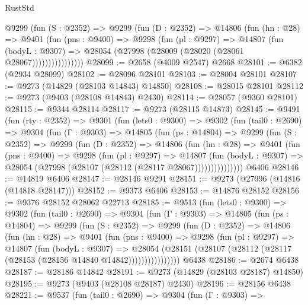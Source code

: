\begin{lexlean}{RustStd}
\begin{coremodule}
              @9299
                (fun (S : @2352) =>
                @9299
                  (fun (D : @2352) =>
                  @14806
                    (fun (hn : @28) =>
                    @9401
                      (fun (pns : @9400) =>
                      @9298
                        (fun (pl : @9297) =>
                        @14807
                          (fun (bodyL : @9307) =>
                          @28054 (@27998 (@28009 (@28020 (@28061 @28067))))))))))))))))
@28099 := @2658 (@4009 @2547) @2668
@28101 := @6382 (@2934 @28099)
@28102 := @28096 @28101
@28103 := @28004 @28101
@28107 := @9273 (@14829 (@28103 @14843) @14850)
@28108 := @28015 @28101
@28112 := @9273 (@9403 (@28108 @14843) @2430)
@28114 := @28057 (@9360 @28101)
@28115 := @9344 @28114
@28117 := @9273 (@28115 @14873)
@28145 := @9491
    (fun (rty : @2352) =>
    @9301
      (fun (lets0 : @9300) =>
      @9302
        (fun (tail0 : @2690) =>
        @9304
          (fun (Γ : @9303) =>
          @14805
            (fun (ps : @14804) =>
            @9299
              (fun (S : @2352) =>
              @9299
                (fun (D : @2352) =>
                @14806
                  (fun (hn : @28) =>
                  @9401
                    (fun (pns : @9400) =>
                    @9298
                      (fun (pl : @9297) =>
                      @14807
                        (fun (bodyL : @9307) =>
                        @28054 (@27998 (@28107 (@28112 (@28117 @28067)))))))))))))))
    @6406
@28146 := @14819 @6406
@28147 := @28146 @9291
@28151 := @9273 (@27996 (@14816 (@14818 @28147)))
@28152 := @9373 @6406
@28153 := @14876 @28152
@28156 := @9376 @28152 @28062 @22713
@28185 := @9513
    (fun (lets0 : @9300) =>
    @9302
      (fun (tail0 : @2690) =>
      @9304
        (fun (Γ : @9303) =>
        @14805
          (fun (ps : @14804) =>
          @9299
            (fun (S : @2352) =>
            @9299
              (fun (D : @2352) =>
              @14806
                (fun (hn : @28) =>
                @9401
                  (fun (pns : @9400) =>
                  @9298
                    (fun (pl : @9297) =>
                    @14807
                      (fun (bodyL : @9307) =>
                      @28054
                        (@28151
                          (@28107 (@28112 (@28117 (@28153 (@28156 @14840 @14842))))))))))))))))
    @6438
@28186 := @2674 @6438
@28187 := @28186 @14842
@28191 := @9273 (@14829 (@28103 @28187) @14850)
@28195 := @9273 (@9403 (@28108 @28187) @2430)
@28196 := @28156 @6438
@28221 := @9537
    (fun (tail0 : @2690) =>
    @9304
      (fun (Γ : @9303) =>

\end{coremodule}
\end{lexlean}
